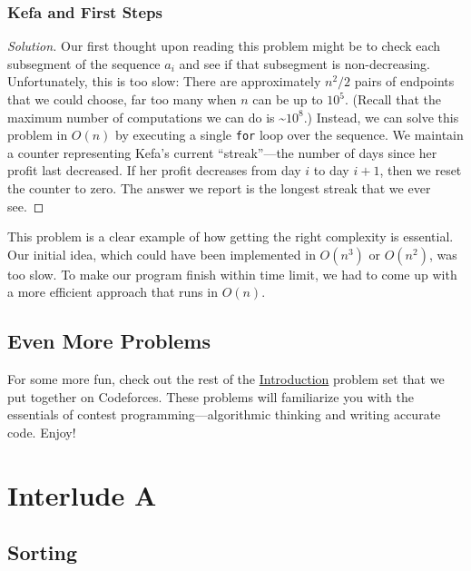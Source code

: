 \subsection{Kefa and First Steps}

\begin{proof}[Solution]
Our first thought upon reading this problem might be to check each subsegment of the sequence $a_i$ and see if that subsegment is non-decreasing. Unfortunately, this is too slow: There are approximately $n^2/2$ pairs of endpoints that we could choose, far too many when $n$ can be up to $10^5$. (Recall that the maximum number of computations we can do is \textasciitilde$10^8$.) Instead, we can solve this problem in $O(n)$ by executing a single \texttt{for} loop over the sequence. We maintain a counter representing Kefa's current ``streak''---the number of days since her profit last decreased. If her profit decreases from day $i$ to day $i+1$, then we reset the counter to zero. The answer we report is the longest streak that we ever see.
\end{proof}

This problem is a clear example of how getting the right complexity is essential. Our initial idea, which could have been implemented in $O(n^3)$ or $O(n^2)$, was too slow. To make our program finish within time limit, we had to come up with a more efficient approach that runs in $O(n)$.

\section{Even More Problems}

For some more fun, check out the rest of the \href{http://codeforces.com/group/5tN48zOVvQ/contest/204614}{Introduction} problem set that we put together on Codeforces. These problems will familiarize you with the essentials of contest programming---algorithmic thinking and writing accurate code. Enjoy!

\begingroup
\chapter*{Interlude A}

\section{Sorting}

